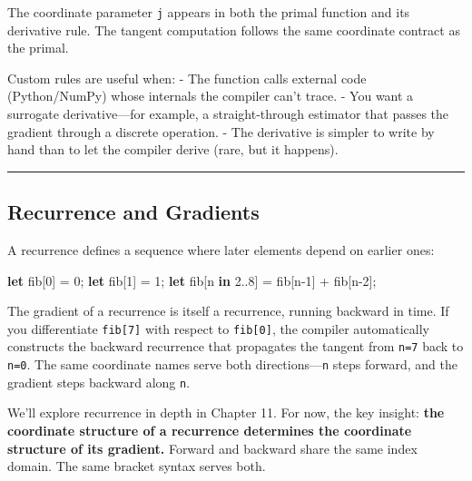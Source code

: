 \documentclass[11pt,]{article}
\newenvironment{Shaded}{}{}
\newcommand{\DecValTok}[1]{\textcolor[rgb]{0.25,0.63,0.44}{#1}}
\newcommand{\KeywordTok}[1]{\textcolor[rgb]{0.00,0.44,0.13}{\textbf{#1}}}
\newcommand{\NormalTok}[1]{#1}
\newcommand{\OperatorTok}[1]{\textcolor[rgb]{0.40,0.40,0.40}{#1}}
\begin{document}
The coordinate parameter \texttt{j} appears in both the primal function
and its derivative rule. The tangent computation follows the same
coordinate contract as the primal.

Custom rules are useful when: - The function calls external code
(Python/NumPy) whose internals the compiler can't trace. - You want a
surrogate derivative---for example, a straight-through estimator that
passes the gradient through a discrete operation. - The derivative is
simpler to write by hand than to let the compiler derive (rare, but it
happens).

\begin{center}\rule{0.5\linewidth}{0.4pt}\end{center}

\hypertarget{recurrence-and-gradients}{%
\subsection{Recurrence and Gradients}\label{recurrence-and-gradients}}

A recurrence defines a sequence where later elements depend on earlier
ones:

\begin{Shaded}
\begin{Highlighting}[]
\KeywordTok{let}\NormalTok{ fib}\OperatorTok{[}\DecValTok{0}\OperatorTok{]}\NormalTok{ = }\DecValTok{0}\NormalTok{;}
\KeywordTok{let}\NormalTok{ fib}\OperatorTok{[}\DecValTok{1}\OperatorTok{]}\NormalTok{ = }\DecValTok{1}\NormalTok{;}
\KeywordTok{let}\NormalTok{ fib}\OperatorTok{[}\NormalTok{n }\KeywordTok{in} \DecValTok{2.}\NormalTok{.}\DecValTok{8}\OperatorTok{]}\NormalTok{ = fib}\OperatorTok{[}\NormalTok{n-}\DecValTok{1}\OperatorTok{]}\NormalTok{ + fib}\OperatorTok{[}\NormalTok{n-}\DecValTok{2}\OperatorTok{]}\NormalTok{;}
\end{Highlighting}
\end{Shaded}

The gradient of a recurrence is itself a recurrence, running backward in
time. If you differentiate \texttt{fib{[}7{]}} with respect to
\texttt{fib{[}0{]}}, the compiler automatically constructs the backward
recurrence that propagates the tangent from \texttt{n=7} back to
\texttt{n=0}. The same coordinate names serve both
directions---\texttt{n} steps forward, and the gradient steps backward
along \texttt{n}.

We'll explore recurrence in depth in Chapter 11. For now, the key
insight: \textbf{the coordinate structure of a recurrence determines the
coordinate structure of its gradient.} Forward and backward share the
same index domain. The same bracket syntax serves both.
\end{document}
